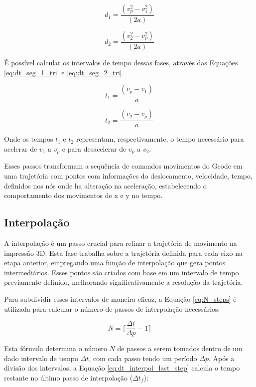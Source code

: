 \begin{equation}
    \label{eq:des_seg_1_tri}
    d_1 = \frac{(v_p^2-v_1^2)}{(2 a)}
\end{equation}

\begin{equation}
    \label{eq:des_seg_2_tri}
    d_2 = \frac{(v_2^2-v_p^2)}{(2 a)}
\end{equation}

É possível calcular os intervalos de tempo dessas fases, através das Equações \ref{eq:dt_seg_1_tri} e \ref{eq:dt_seg_2_tri}.

\begin{equation}
    \label{eq:dt_seg_1_tri}
    t_1 = \frac{(v_p-v_1)}{a}
\end{equation}

\begin{equation}
    \label{eq:dt_seg_2_tri}
    t_2 = \frac{(v_2-v_p)}{a}
\end{equation}

Onde os tempos \(t_1\) e \(t_2\) representam, respectivamente, o tempo necessário para acelerar de \(v_1\) a \(v_p\) e para desacelerar de \(v_p\) a \(v_2\). 

Esses passos transformam a sequência de comandos movimentos do Gcode em uma trajetória com pontos com informações do deslocamento, velocidade, tempo, definidos nos nós onde ha alteração na aceleração, estabelecendo o comportamento dos movimentos de x e y no tempo.

\subsection{Interpolação}
A interpolação é um passo crucial para refinar a trajetória de movimento na impressão 3D. Esta fase trabalha sobre a trajetória definida para cada eixo na etapa anterior, empregando uma função de interpolação que gera pontos intermediários. Esses pontos são criados com base em um intervalo de tempo previamente definido, melhorando significativamente a resolução da trajetória.

Para subdividir esses intervalos de maneira eficaz, a Equação \ref{eq:N_steps} é utilizada para calcular o número de passos de interpolação necessários:

\begin{equation}
    \label{eq:N_steps}
    N = \lceil\frac{\Delta t}{\Delta p}-1\rceil
\end{equation}

Esta fórmula determina o número \( N \) de passos a serem tomados dentro de um dado intervalo de tempo \( \Delta t \), com cada passo tendo um período \( \Delta p \). Após a divisão dos intervalos, a Equação \ref{eq:dt_interpol_last_step} calcula o tempo restante no último passo de interpolação (\(\Delta t_f\)):

